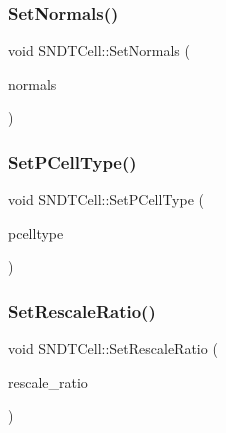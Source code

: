 \mbox{\label{classSNDTCell_a1c8a5478d1cae57f3f169afb25d18fc3}} 
\subsubsection{\texorpdfstring{Set\+Normals()}{SetNormals()}}
{\footnotesize\ttfamily void S\+N\+D\+T\+Cell\+::\+Set\+Normals (\begin{DoxyParamCaption}\item[{const std\+::vector$<$ Eigen\+::\+Vector2d $>$ \&}]{normals }\end{DoxyParamCaption})\hspace{0.3cm}{\ttfamily [inline]}}

\mbox{\label{classSNDTCell_a24f8966d1a574ebd12f1290fec08aa88}} 
\subsubsection{\texorpdfstring{Set\+P\+Cell\+Type()}{SetPCellType()}}
{\footnotesize\ttfamily void S\+N\+D\+T\+Cell\+::\+Set\+P\+Cell\+Type (\begin{DoxyParamCaption}\item[{\hyperlink{classSNDTCell_a89f320f167cfeb7ccdbb4a578a169341}{Cell\+Type}}]{pcelltype }\end{DoxyParamCaption})\hspace{0.3cm}{\ttfamily [inline]}}

\mbox{\label{classSNDTCell_ad53148612767d089b246e6658f0f630f}} 
\subsubsection{\texorpdfstring{Set\+Rescale\+Ratio()}{SetRescaleRatio()}}
{\footnotesize\ttfamily void S\+N\+D\+T\+Cell\+::\+Set\+Rescale\+Ratio (\begin{DoxyParamCaption}\item[{double}]{rescale\+\_\+ratio }\end{DoxyParamCaption})\hspace{0.3cm}{\ttfamily [inline]}}

